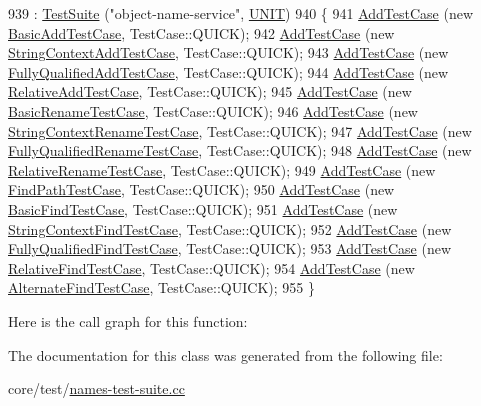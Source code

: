 \begin{DoxyCode}
939   : \hyperlink{classns3_1_1TestSuite_a904b0c40583b744d30908aeb94636d1a}{TestSuite} (\textcolor{stringliteral}{"object-name-service"}, \hyperlink{classns3_1_1TestSuite_a1ebfcab34ec8161e085e8e3a1855eae0a3885375a3787abf60431f8454b3cadbd}{UNIT})
940 \{
941   \hyperlink{classns3_1_1TestCase_a3718088e3eefd5d6454569d2e0ddd835}{AddTestCase} (\textcolor{keyword}{new} \hyperlink{classBasicAddTestCase}{BasicAddTestCase}, TestCase::QUICK);
942   \hyperlink{classns3_1_1TestCase_a3718088e3eefd5d6454569d2e0ddd835}{AddTestCase} (\textcolor{keyword}{new} \hyperlink{classStringContextAddTestCase}{StringContextAddTestCase}, TestCase::QUICK);
943   \hyperlink{classns3_1_1TestCase_a3718088e3eefd5d6454569d2e0ddd835}{AddTestCase} (\textcolor{keyword}{new} \hyperlink{classFullyQualifiedAddTestCase}{FullyQualifiedAddTestCase}, TestCase::QUICK);
944   \hyperlink{classns3_1_1TestCase_a3718088e3eefd5d6454569d2e0ddd835}{AddTestCase} (\textcolor{keyword}{new} \hyperlink{classRelativeAddTestCase}{RelativeAddTestCase}, TestCase::QUICK);
945   \hyperlink{classns3_1_1TestCase_a3718088e3eefd5d6454569d2e0ddd835}{AddTestCase} (\textcolor{keyword}{new} \hyperlink{classBasicRenameTestCase}{BasicRenameTestCase}, TestCase::QUICK);
946   \hyperlink{classns3_1_1TestCase_a3718088e3eefd5d6454569d2e0ddd835}{AddTestCase} (\textcolor{keyword}{new} \hyperlink{classStringContextRenameTestCase}{StringContextRenameTestCase}, TestCase::QUICK);
947   \hyperlink{classns3_1_1TestCase_a3718088e3eefd5d6454569d2e0ddd835}{AddTestCase} (\textcolor{keyword}{new} \hyperlink{classFullyQualifiedRenameTestCase}{FullyQualifiedRenameTestCase}, TestCase::QUICK);
948   \hyperlink{classns3_1_1TestCase_a3718088e3eefd5d6454569d2e0ddd835}{AddTestCase} (\textcolor{keyword}{new} \hyperlink{classRelativeRenameTestCase}{RelativeRenameTestCase}, TestCase::QUICK);
949   \hyperlink{classns3_1_1TestCase_a3718088e3eefd5d6454569d2e0ddd835}{AddTestCase} (\textcolor{keyword}{new} \hyperlink{classFindPathTestCase}{FindPathTestCase}, TestCase::QUICK);
950   \hyperlink{classns3_1_1TestCase_a3718088e3eefd5d6454569d2e0ddd835}{AddTestCase} (\textcolor{keyword}{new} \hyperlink{classBasicFindTestCase}{BasicFindTestCase}, TestCase::QUICK);
951   \hyperlink{classns3_1_1TestCase_a3718088e3eefd5d6454569d2e0ddd835}{AddTestCase} (\textcolor{keyword}{new} \hyperlink{classStringContextFindTestCase}{StringContextFindTestCase}, TestCase::QUICK);
952   \hyperlink{classns3_1_1TestCase_a3718088e3eefd5d6454569d2e0ddd835}{AddTestCase} (\textcolor{keyword}{new} \hyperlink{classFullyQualifiedFindTestCase}{FullyQualifiedFindTestCase}, TestCase::QUICK);
953   \hyperlink{classns3_1_1TestCase_a3718088e3eefd5d6454569d2e0ddd835}{AddTestCase} (\textcolor{keyword}{new} \hyperlink{classRelativeFindTestCase}{RelativeFindTestCase}, TestCase::QUICK);
954   \hyperlink{classns3_1_1TestCase_a3718088e3eefd5d6454569d2e0ddd835}{AddTestCase} (\textcolor{keyword}{new} \hyperlink{classAlternateFindTestCase}{AlternateFindTestCase}, TestCase::QUICK);
955 \}
\end{DoxyCode}


Here is the call graph for this function\+:




The documentation for this class was generated from the following file\+:\begin{DoxyCompactItemize}
\item 
core/test/\hyperlink{names-test-suite_8cc}{names-\/test-\/suite.\+cc}\end{DoxyCompactItemize}
